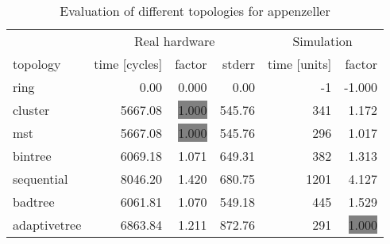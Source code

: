 \begin{table}[htb]
  \centering
  \begin{tabular}{lrrrrr}
  \toprule
  & \multicolumn{3}{c}{Real hardware} & \multicolumn{2}{c}{Simulation} \\
  topology & time [cycles] & factor & stderr & time [units] & factor \\
  \midrule
  ring & 0.00 & 0.000 & 0.00 & -1 & -1.000 \\
  cluster & 5667.08 & \colorbox{gray}{1.000} & 545.76 & 341 & 1.172 \\
  mst & 5667.08 & \colorbox{gray}{1.000} & 545.76 & 296 & 1.017 \\
  bintree & 6069.18 & 1.071 & 649.31 & 382 & 1.313 \\
  sequential & 8046.20 & 1.420 & 680.75 & 1201 & 4.127 \\
  badtree & 6061.81 & 1.070 & 549.18 & 445 & 1.529 \\
  adaptivetree & 6863.84 & 1.211 & 872.76 & 291 & \colorbox{gray}{1.000} \\
  \midrule
  \end{tabular}
  \caption{Evaluation of different topologies for appenzeller}
  \label{tab:appenzeller}
\end{table}

